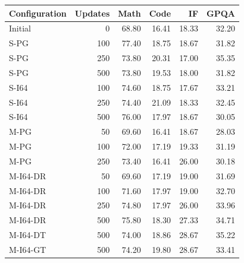 \begin{tabular}{lrrrrr}
\toprule
Configuration & Updates & Math & Code & IF & GPQA \\
\midrule
Initial & 0 & 68.80 & 16.41 & 18.33 & 32.20 \\
S-PG & 100 & 77.40 & 18.75 & 18.67 & 31.82 \\
S-PG & 250 & 73.80 & 20.31 & 17.00 & 35.35 \\
S-PG & 500 & 73.80 & 19.53 & 18.00 & 31.82 \\
S-I64 & 100 & 74.60 & 18.75 & 17.67 & 33.21 \\
S-I64 & 250 & 74.40 & 21.09 & 18.33 & 32.45 \\
S-I64 & 500 & 76.00 & 17.97 & 18.67 & 30.05 \\
M-PG & 50 & 69.60 & 16.41 & 18.67 & 28.03 \\
M-PG & 100 & 72.00 & 17.19 & 19.33 & 31.19 \\
M-PG & 250 & 73.40 & 16.41 & 26.00 & 30.18 \\
M-I64-DR & 50 & 69.60 & 17.19 & 19.00 & 31.69 \\
M-I64-DR & 100 & 71.60 & 17.97 & 19.00 & 32.70 \\
M-I64-DR & 250 & 74.80 & 17.97 & 26.00 & 33.96 \\
M-I64-DR & 500 & 75.80 & 18.30 & 27.33 & 34.71 \\
M-I64-DT & 500 & 74.00 & 18.86 & 28.67 & 35.22 \\
M-I64-GT & 500 & 74.20 & 19.80 & 28.67 & 33.41 \\
\bottomrule
\end{tabular}
